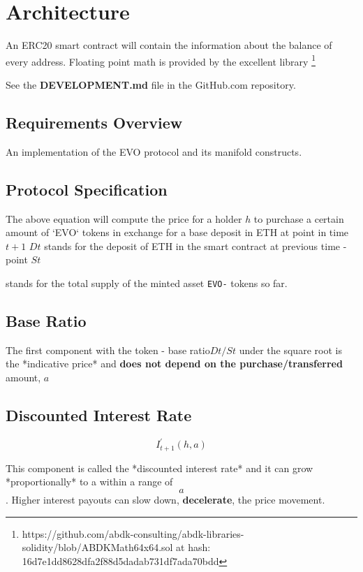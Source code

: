 \section{Architecture}
\label{architecture}

An ERC20 smart contract will contain the information about the balance of every address.
Floating point math is provided by the excellent library \footnote{https://github.com/abdk-consulting/abdk-libraries-solidity/blob/ABDKMath64x64.sol at hash: 16d7e1dd8628dfa2f88d5dadab731df7ada70bdd }

See the \textbf{DEVELOPMENT.md} file in the GitHub.com repository.

\subsection{Requirements Overview}

An implementation of the EVO protocol and its manifold constructs.

\subsection{Protocol Specification}
The above equation will compute the price for a holder $h$ to purchase a certain amount of `EVO` tokens in exchange for a base deposit in ETH at point in time  $t +1$ \neweline $Dt$ stands for the deposit of ETH in the smart contract at previous time - point
\newline$St$
    
stands for the total supply of the minted asset \texttt{EVO-} tokens so far.

\subsection{Base Ratio}
The first component with the token - base ratio\neweline $ Dt/St $ under the square root is the *indicative price* and \textbf{does not depend on the purchase/transferred} amount, $a$

\subsection{Discounted Interest Rate}
\begin{equation}
	I_{t+1}^{\prime}(h, a)
\end{equation}

This component is called the *discounted interest rate* and it can grow *proportionally* to a within a range of 
\begin{equation}
	[0, 0.24] a 
\end{equation}
.
Higher interest payouts can slow down, \textbf{decelerate}, the price movement. 

